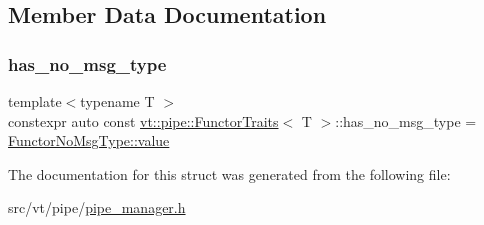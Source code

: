 \subsection{Member Data Documentation}
\mbox{\label{structvt_1_1pipe_1_1_functor_traits_aace8b00c70112f7711ce73f1799f7e00}} 
\subsubsection{\texorpdfstring{has\+\_\+no\+\_\+msg\+\_\+type}{has\_no\_msg\_type}}
{\footnotesize\ttfamily template$<$typename T $>$ \\
constexpr auto const \hyperlink{structvt_1_1pipe_1_1_functor_traits}{vt\+::pipe\+::\+Functor\+Traits}$<$ T $>$\+::has\+\_\+no\+\_\+msg\+\_\+type = \hyperlink{structdetection_1_1detector_a6d7d0e1bdf5903db9edbe448edccf83b}{Functor\+No\+Msg\+Type\+::value}\hspace{0.3cm}{\ttfamily [static]}}



The documentation for this struct was generated from the following file\+:\begin{DoxyCompactItemize}
\item 
src/vt/pipe/\hyperlink{pipe__manager_8h}{pipe\+\_\+manager.\+h}\end{DoxyCompactItemize}

